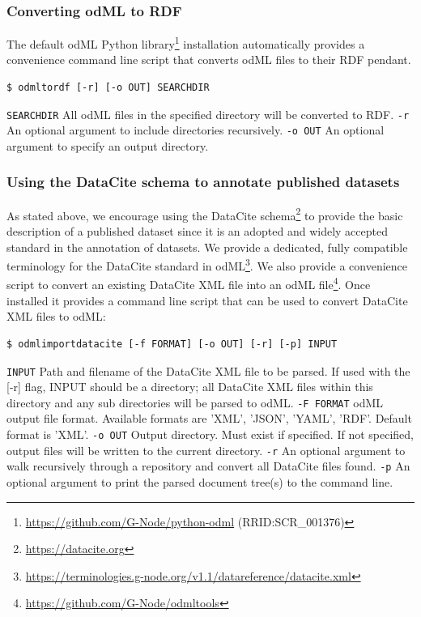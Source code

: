 \documentclass{article}
\begin{document}
\subsubsection{Converting odML to RDF} \label{sec:odml_conversion}
The default odML Python library\footnote{\url{https://github.com/G-Node/python-odml} (RRID:SCR\_001376)} installation automatically provides a convenience command line script that converts odML files to their RDF pendant.

\begin{lstlisting}[label=lst:conversion_script, caption=odML to RDF conversion Python script]
$ odmltordf [-r] [-o OUT] SEARCHDIR
\end{lstlisting}

\texttt{SEARCHDIR} All odML files in the specified directory will be converted to RDF.
\texttt{-r} An optional argument to include directories recursively.
\texttt{-o OUT} An optional argument to specify an output directory.

\subsubsection{Using the DataCite schema to annotate published datasets} \label{sec:datacite}
As stated above, we encourage using the DataCite schema\footnote{\url{https://datacite.org}} to provide the basic description of a published dataset since it is an adopted and widely accepted standard in the annotation of datasets. We provide a dedicated, fully compatible terminology for the DataCite standard in odML\footnote{\url{https://terminologies.g-node.org/v1.1/datareference/datacite.xml}}. We also provide a convenience script to convert an existing DataCite XML file into an odML file\footnote{\url{https://github.com/G-Node/odmltools}}. Once installed it provides a command line script that can be used to convert DataCite XML files to odML:

\begin{lstlisting}[label=lst:datacite_script, caption=Datacite import Python script]
$ odmlimportdatacite [-f FORMAT] [-o OUT] [-r] [-p] INPUT
\end{lstlisting}

\texttt{INPUT} Path and filename of the DataCite XML file to be parsed. If used with the [-r] flag, INPUT should be a directory; all DataCite XML files within this directory and any sub directories will be parsed to odML.
\texttt{-F FORMAT} odML output file format. Available formats are 'XML', 'JSON', 'YAML', 'RDF'. Default format is 'XML'.
\texttt{-o OUT} Output directory. Must exist if specified. If not specified, output files will be written to the current directory.
\texttt{-r} An optional argument to walk recursively through a repository and convert all DataCite files found.
\texttt{-p} An optional argument to print the parsed document tree(s) to the command line.
\end{document}
